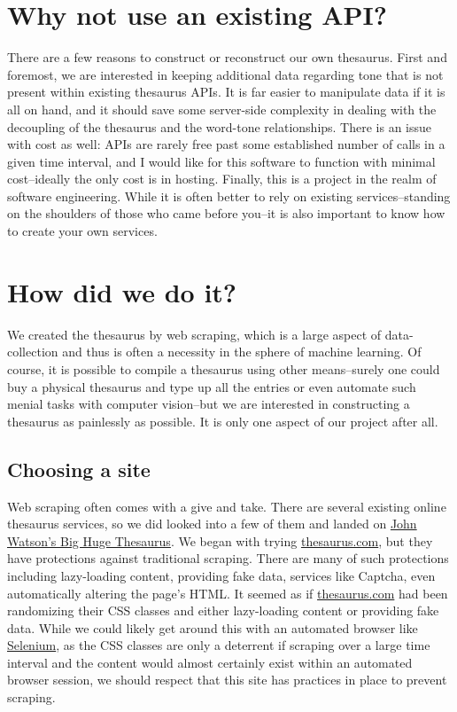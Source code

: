 \documentclass[11pt, twoside, reqno]{book}
\begin{document}
\section{Why not use an existing API?}

There are a few reasons to construct or reconstruct our own thesaurus. First and foremost, we are interested in keeping additional data regarding tone that is not present within existing thesaurus APIs. It is far easier to manipulate data if it is all on hand, and it should save some server-side complexity in dealing with the decoupling of the thesaurus and the word-tone relationships. There is an issue with cost as well: APIs are rarely free past some established number of calls in a given time interval, and I would like for this software to function with minimal cost--ideally the only cost is in hosting. Finally, this is a project in the realm of software engineering. While it is often better to rely on existing services--standing on the shoulders of those who came before you--it is also important to know how to create your own services.

\section{How did we do it?}

We created the thesaurus by web scraping, which is a large aspect of data-collection and thus is often a necessity in the sphere of machine learning. Of course, it is possible to compile a thesaurus using other means--surely one could buy a physical thesaurus and type up all the entries or even automate such menial tasks with computer vision--but we are interested in constructing a thesaurus as painlessly as possible. It is only one aspect of our project after all.

\subsection{Choosing a site}

Web scraping often comes with a give and take. There are several existing online thesaurus services, so we did looked into a few of them and landed on \href{https://words.bighugelabs.com}{John Watson's Big Huge Thesaurus}. We began with trying \href{https://www.thesaurus.com}{thesaurus.com}, but they have protections against traditional scraping. There are many of such protections including lazy-loading content, providing fake data, services like Captcha, even automatically altering the page's HTML. It seemed as if \href{https://www.thesaurus.com}{thesaurus.com} had been randomizing their CSS classes and either lazy-loading content or providing fake data. While we could likely get around this with an automated browser like \href{https://www.seleniumhq.org/}{Selenium}, as the CSS classes are only a deterrent if scraping over a large time interval and the content would almost certainly exist within an automated browser session, we should respect that this site has practices in place to prevent scraping.
\end{document}
